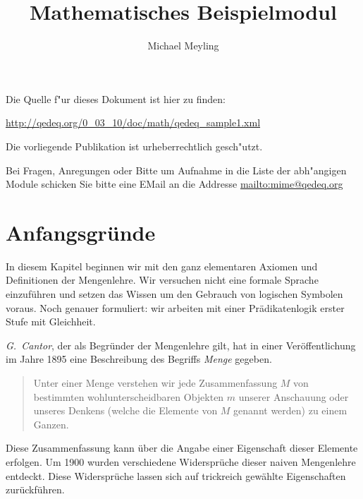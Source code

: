 \documentclass[a4paper,german,10pt,twoside]{book}
\title{Mathematisches Beispielmodul}
\author{
Michael Meyling
}
\theoremstyle{definition}
\theoremstyle{remark}
\begin{document}
\maketitle

\setlength{\parskip}{5pt plus 2pt minus 1pt}
\mbox{}
\vfill

\par
Die Quelle f{"ur} dieses Dokument ist hier zu finden:
\par
\url{http://qedeq.org/0_03_10/doc/math/qedeq_sample1.xml}

\par
Die vorliegende Publikation ist urheberrechtlich gesch{"u}tzt.
\par
Bei Fragen, Anregungen oder Bitte um Aufnahme in die Liste der abh{"a}ngigen Module schicken Sie bitte eine EMail an die Addresse \url{mailto:mime@qedeq.org}

\setlength{\parskip}{0pt}
\tableofcontents

\setlength{\parskip}{5pt plus 2pt minus 1pt}

\chapter{Anfangsgr{\"u}nde} \label{chapter0} \hypertarget{chapter0}{}

In diesem Kapitel beginnen wir mit den ganz elementaren Axiomen und Definitionen der Mengenlehre. Wir versuchen nicht eine formale Sprache einzuf{\"u}hren und setzen das Wissen um den Gebrauch von logischen Symbolen voraus. Noch genauer formuliert: wir arbeiten mit einer Pr{\"a}dikatenlogik erster Stufe mit Gleichheit.

\par
\emph{G.~Cantor}, der als Begr{\"u}nder der Mengenlehre gilt, hat in einer Ver{\"o}ffentlichung im Jahre 1895 eine Beschreibung des Begriffs \emph{Menge} gegeben.

\begin{quote}
 Unter einer {\glqq Menge\grqq} verstehen wir jede Zusammenfassung $M$ von bestimmten wohlunterscheidbaren Objekten $m$ unserer Anschauung oder unseres Denkens (welche die {\glqq Elemente\grqq} von $M$ genannt werden) zu einem Ganzen.
\end{quote}

\par
Diese Zusammenfassung kann {\"u}ber die Angabe einer Eigenschaft dieser Elemente erfolgen. Um 1900 wurden verschiedene Widerspr{\"u}che dieser naiven Mengenlehre entdeckt. Diese Widerspr{\"u}che lassen sich auf trickreich gew{\"a}hlte Eigenschaften zur{\"u}ckf{\"u}hren.
\end{document}
